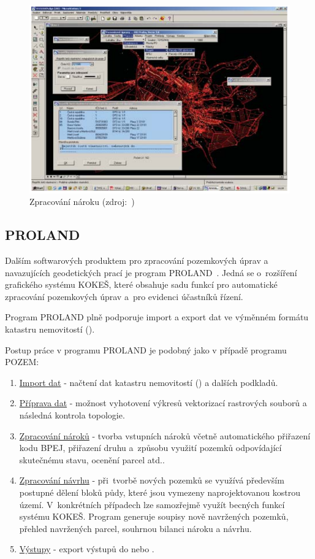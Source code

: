 	\begin{figure}[H]
		\centering
		\includegraphics[width=.8\textwidth]{./pictures/pozem.png}
		\caption[Zpracování nároku]{Zpracování nároku (zdroj:~\citep{pozem})}
		\label{fig:pozem-obrazek}
 	\end{figure}

\subsection{PROLAND}
\label{proland}

Dalším softwarových produktem pro zpracování pozemkových úprav a navazujících geodetických prací je program PROLAND~\citep{proland}. Jedná se o~rozšíření grafického systému KOKEŠ, které obsahuje sadu funkcí pro automatické zpracování pozemkových úprav a~pro evidenci účastníků řízení.

Program PROLAND plně podporuje import a export dat ve výměnném formátu katastru nemovitostí ().

Postup práce v programu PROLAND je podobný jako v případě programu POZEM:
	\begin{enumerate}[leftmargin=1.5cm]
		\item \underline{Import dat} - načtení dat katastru nemovitostí () a dalších podkladů.
		\item \underline{Příprava dat} - možnost vyhotovení výkresů vektorizací rastrových souborů a následná kontrola topologie.
		\item \underline{Zpracování nároků} - tvorba vstupních nároků včetně automatického přiřazení kodu BPEJ, přiřazení druhu a~způsobu využití pozemků odpovídající skutečnému stavu, ocenění parcel atd..
		\item \underline{Zpracování návrhu} - při~tvorbě nových pozemků se využívá především postupné dělení bloků půdy, které jsou vymezeny naprojektovanou kostrou území. V~konkrétních případech lze samozřejmě využít becných funkcí systému KOKEŠ. Program generuje soupisy nově navržených pozemků, přehled navržených parcel, souhrnou bilanci nároku a návrhu.
		\item \underline{Výstupy} - export výstupů do  nebo .
	\end{enumerate}

